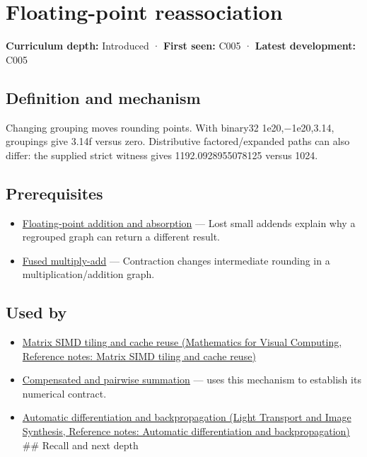 \hypertarget{appendix-c2ac4a84c283}{}\label{referencestart:appendix-c2ac4a84c283}
\section{Floating-point reassociation}\label{appendix-c2ac4a84c283-floating-point-reassociation}

\textbf{Curriculum depth:} Introduced · \textbf{First seen:} C005 · \textbf{Latest development:} C005

\begin{allmightroledefinition}

\subsection{Definition and mechanism}\label{appendix-c2ac4a84c283-definition-and-mechanism}

Changing grouping moves rounding points. With binary32 1e20,−1e20,3.14, groupings give 3.14f versus zero. Distributive factored/expanded paths can also differ: the supplied strict witness gives 1192.0928955078125 versus 1024.

\end{allmightroledefinition}

\subsection{Prerequisites}\label{appendix-c2ac4a84c283-prerequisites}

\begin{itemize}
\tightlist
\item
  \hyperref[appendix-a1b1b4580dfd]{Floating-point addition and absorption} --- Lost small addends explain why a regrouped graph can return a different result.
\item
  \hyperref[appendix-41e8ef22a21e]{Fused multiply-add} --- Contraction changes intermediate rounding in a multiplication/addition graph.
\end{itemize}

\subsection{Used by}\label{appendix-c2ac4a84c283-used-by}

\begin{itemize}
\item
  \href{../02-Mathematics-for-Visual-Computing/main.pdf\#nameddest=appendix-1bfb7c657105}{Matrix SIMD tiling and cache reuse (Mathematics for Visual Computing, Reference notes: Matrix SIMD tiling and cache reuse)}
\item
  \hyperref[appendix-df318da57389]{Compensated and pairwise summation} --- uses this mechanism to establish its numerical contract.
\item
  \href{../04-Light-Transport-and-Image-Synthesis/main.pdf\#nameddest=appendix-40df0855b4a7}{Automatic differentiation and backpropagation (Light Transport and Image Synthesis, Reference notes: Automatic differentiation and backpropagation)} \#\# Recall and next depth
\end{itemize}


